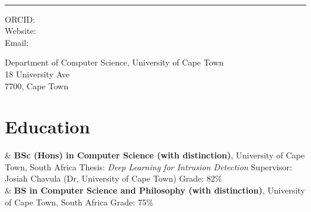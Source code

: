 \documentclass[10pt,a4paper]{article}
\begin{document}
\begin{minipage}[t]{0.5\textwidth}
	{\fontsize{20pt}{0}\selectfont\MyName}
\end{minipage}
\begin{minipage}[t]{0.5\textwidth}
	\begin{flushright}
		\Title{}
	\end{flushright}
\end{minipage}
\\[-0.1cm]
\textcolor{lightgray}{\rule{\textwidth}{3pt}}
\begin{minipage}[t]{0.5\textwidth}
	ORCID: \href{https://orcid.org/\ORCID}{\ORCID}
	\\
	Website: \Website{\PersonalWebsite}
	\\
	Email: \href{mailto:\Email}{\Email}
\end{minipage}
\begin{minipage}[t]{0.5\textwidth}
	\begin{flushright}
		Department of Computer Science, University of Cape Town\\
		18 University Ave\\
		7700, Cape Town
	\end{flushright}
\end{minipage}
\vspace{0.3cm}


\section{Education}

\begin{EntriesTableDuration}
	 & \textbf{BSc (Hons) in Computer Science (with distinction)}, University of Cape Town, South Africa \newline
	Thesis: \emph{Deep Learning for Intrusion Detection} \newline
	Supervisor: Josiah Chavula (Dr, University of Cape Town) \newline
	Grade: 82\%
	\\
	 & \textbf{BS in Computer Science and Philosophy (with distinction)}, University of Cape Town, South Africa \newline
	Grade: 75\%
\end{EntriesTableDuration}
\end{document}
